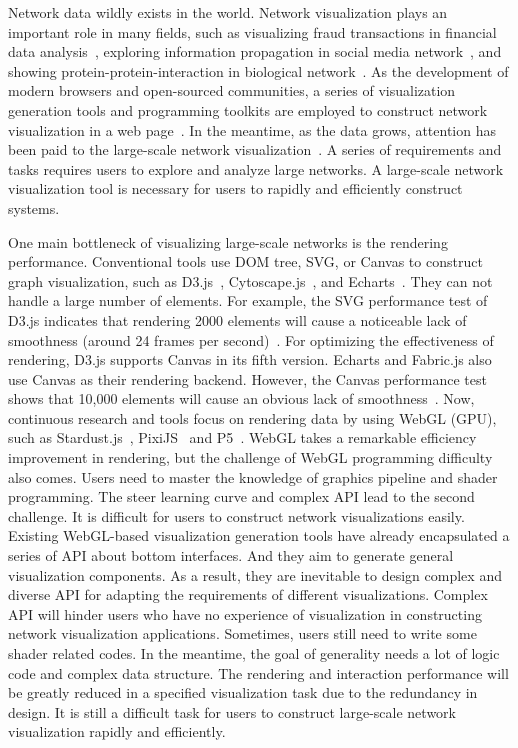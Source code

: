 Network data wildly exists in the world. Network visualization plays an important role in many fields, such as visualizing fraud transactions in financial data analysis~\cite{DBLP:journals/tvcg/ChenGHPNXZ19}, exploring information propagation in social media network~\cite{DBLP:conf/candt/SmithSMRBDCPG09}, and showing protein-protein-interaction in biological network~\cite{doncheva2012topological}.
As the development of modern browsers and open-sourced communities, a series of
visualization generation tools and programming toolkits are employed to construct network visualization in a web page~\cite{DBLP:journals/tvcg/SrinivasanPEB18,DBLP:conf/ieeevast/BigelowNML19}. In the meantime, as the data grows, attention has been paid to the large-scale network visualization~\cite{DBLP:journals/tvcg/ChenGHPNXZ19}. A series of requirements and tasks requires users to explore and analyze large networks. A large-scale network visualization tool is necessary for users to rapidly and efficiently construct systems.

One main bottleneck of visualizing large-scale networks is the rendering performance. Conventional tools use DOM tree, SVG, or Canvas to construct graph visualization, such as D3.js~\cite{DBLP:journals/tvcg/BostockOH11}, Cytoscape.js~\cite{DBLP:journals/bioinformatics/FranzLHDSB16}, and Echarts~\cite{DBLP:journals/vi/LiMSSZWZC18}. They can not handle a large number of elements.
For example, the SVG performance test of D3.js indicates that rendering 2000 elements will cause a noticeable lack of smoothness (around 24 frames per second)~\cite{svg}. For optimizing the effectiveness of rendering, D3.js supports Canvas in its fifth version. Echarts and Fabric.js also use Canvas as their rendering backend. However, the Canvas performance test shows that 10,000 elements will cause an obvious lack of smoothness~\cite{canvas}.
Now, continuous research and tools focus on rendering data by using WebGL (GPU), such as Stardust.js~\cite{DBLP:journals/cgf/RenLH17}, PixiJS~\cite{graphicslearn} and P5~\cite{DBLP:journals/tvcg/LiM20}. WebGL takes a remarkable efficiency improvement in rendering, but the challenge of WebGL programming difficulty also comes.
Users need to master the knowledge of graphics pipeline and shader programming.
The steer learning curve and complex API lead to the second challenge.
It is difficult for users to construct network visualizations easily.
Existing WebGL-based visualization generation tools have already
encapsulated a series of API about bottom interfaces. And they aim to generate general visualization components. As a result, they are inevitable to design complex and diverse API for adapting the requirements of different visualizations.
Complex API will hinder users who have no experience of visualization in constructing network visualization applications. Sometimes, users still need to write some shader related codes.
In the meantime, the goal of generality needs a lot of logic code and complex data structure.
The rendering and interaction performance will be greatly reduced in a specified visualization task due to the redundancy in design.
It is still a difficult task for users to construct large-scale network visualization rapidly and efficiently.

